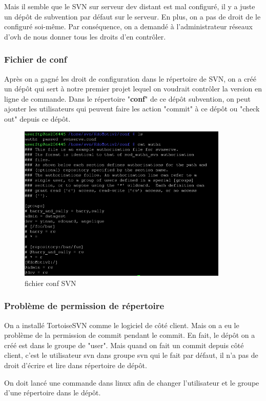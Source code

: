 Mais il semble que le SVN sur serveur dev distant est mal configuré, il y a juste un dépôt de subvention par défaut sur le serveur. En plus, on a pas de droit de le configuré soi-même. Par conséquence, on a demandé  à l'administrateur réseaux d'ovh de nous donner tous les droits d'en contrôler. 

\subsubsection{Fichier de conf}
Après on a gagné les droit de configuration dans le répertoire de SVN, on a créé un dépôt qui sert à notre premier projet lequel on voudrait contrôler la version en ligne de commande. Dans le répertoire "\textbf{conf}" de ce dépôt subvention, on peut ajouter les utilisateurs qui peuvent faire les action "commit" à ce dépôt  ou "check out" depuis ce dépôt. 
\begin{figure}[hbtp]
\centering
\includegraphics[width=10cm]{body/images/conf-svn.png}
\caption{fichier conf SVN}
\end{figure}


\subsubsection{Problème de permission de répertoire }
On a installé TortoiseSVN comme le logiciel de côté client.  Mais on a eu le problème de la permission de commit pendant le commit. En fait, le dépôt on a créé est dans le groupe de "user". Mais quand on fait un commit depuis côté client, c'est le utilisateur svn dans groupe svn qui le fait par défaut, il n'a pas de droit d'écrire et lire dans répertoire de dépôt.

On doit lancé une commande dans linux afin de changer l'utilisateur et le groupe d'une répertoire dans le dépôt. 

